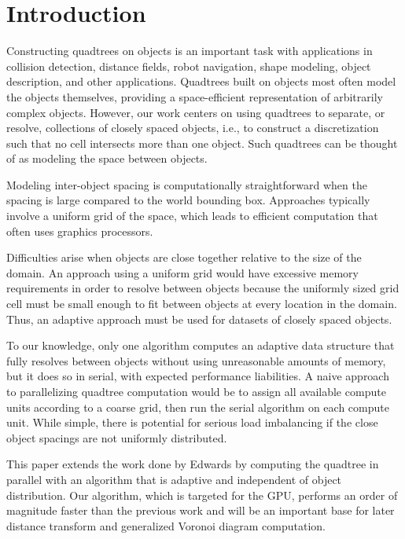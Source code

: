 \documentclass[final,3p,times,twocolumn]{elsarticle}
\begin{document}
\section{Introduction}
\label{sec:intro}
Constructing quadtrees on objects is an important task with applications in collision detection, distance fields, robot navigation, shape modeling, object description, and other applications. Quadtrees built on objects most often model the objects themselves, providing a space-efficient representation of arbitrarily complex objects. However, our work centers on using quadtrees to separate, or resolve, collections of closely spaced objects, i.e., to construct a discretization such that no cell intersects more than one object. Such quadtrees can be thought of as modeling the space between objects.

Modeling inter-object spacing is computationally straightforward when the spacing is large compared to the world bounding box. Approaches typically involve a uniform grid of the space, which leads to efficient computation that often uses graphics processors.

Difficulties arise when objects are close together relative to the size of the domain. An approach using a uniform grid would have excessive memory requirements in order to resolve between objects because the uniformly sized grid cell must be small enough to fit between objects at every location in the domain. Thus, an adaptive approach must be used for datasets of closely spaced objects.

To our knowledge, only one algorithm \cite{edwards2015approximating} computes an adaptive data structure that fully resolves between objects without using unreasonable amounts of memory, but it does so in serial, with expected performance liabilities. A naive approach to parallelizing quadtree computation would be to assign all available compute units according to a coarse grid, then run the serial algorithm on each compute unit. While simple, there is potential for serious load imbalancing if the close object spacings are not uniformly distributed.

This paper extends the work done by Edwards \etal \cite{edwards2015approximating} by computing the quadtree in parallel with an algorithm that is adaptive and independent of object distribution. Our algorithm, which is targeted for the GPU, performs an order of magnitude faster than the previous work and will be an important base for later distance transform and generalized Voronoi diagram computation.
\end{document}
